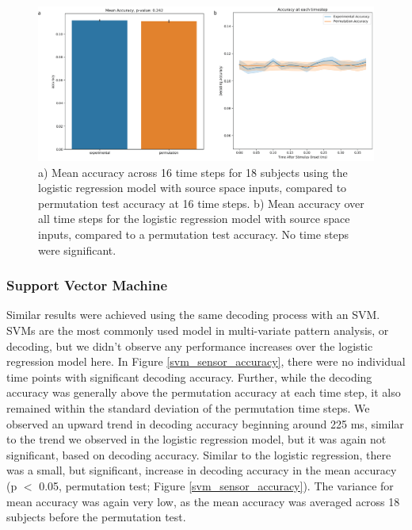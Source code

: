 \documentclass[../main.tex]{subfiles}
\begin{document}
\begin{figure}
    \centering
    \includegraphics[scale=0.7]{figures/results/logistic_source_accuracy.png}
    \caption{a) Mean accuracy across 16 time steps for 18 subjects using the logistic regression model with source space inputs, compared to permutation test accuracy at 16 time steps. b) Mean accuracy over all time steps for the logistic regression model with source space inputs, compared to a permutation test accuracy. No time steps were significant.}
    \label{logistic_source_accuracy}
\end{figure}

\subsubsection*{Support Vector Machine}
Similar results were achieved using the same decoding process with an SVM. SVMs are the most commonly used model in multi-variate pattern analysis, or decoding, but we didn't observe any performance increases over the logistic regression model here. In Figure \ref{svm_sensor_accuracy}, there were no individual time points with significant decoding accuracy. Further, while the decoding accuracy was generally above the permutation accuracy at each time step, it also remained within the standard deviation of the permutation time steps. We observed an upward trend in decoding accuracy beginning around 225 ms, similar to the trend we observed in the logistic regression model, but it was again not significant, based on decoding accuracy. Similar to the logistic regression, there was a small, but significant, increase in decoding accuracy in the mean accuracy (p $<$ 0.05, permutation test; Figure \ref{svm_sensor_accuracy}). The variance for mean accuracy was again very low, as the mean accuracy was averaged across 18 subjects before the permutation test.
\end{document}
